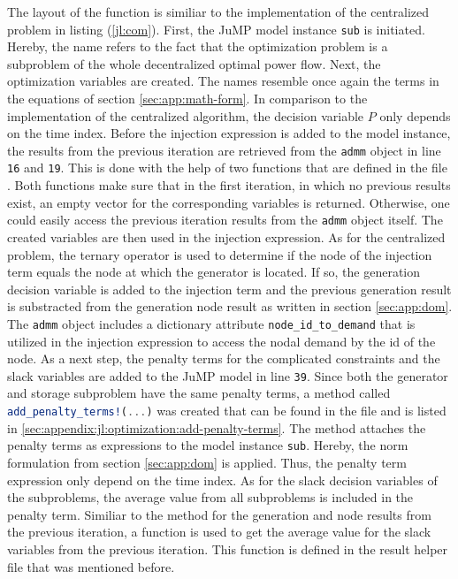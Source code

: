 The layout of the function is similiar to the implementation of the centralized problem in listing (\ref{jl:com}). First, the JuMP model instance \lstinline[language=julia]{sub} is initiated. Hereby, the name refers to the fact that the optimization problem is a subproblem of the whole decentralized optimal power flow. Next, the optimization variables are created. The names resemble once again the terms in the equations of section \ref{sec:app:math-form}. In comparison to the implementation of the centralized algorithm, the decision variable $P$ only depends on the time index. Before the injection expression is added to the model instance, the results from the previous iteration are retrieved from the \lstinline[language=julia]{admm} object in line \texttt{16} and \texttt{19}. This is done with the help of two functions that are defined in the file . Both functions make sure that in the first iteration, in which no previous results exist, an empty vector for the corresponding variables is returned. Otherwise, one could easily access the previous iteration results from the \lstinline[language=julia]{admm} object itself. The created variables are then used in the injection expression. As for the centralized problem, the ternary operator is used to determine if the node of the injection term equals the node at which the generator is located. If so, the generation decision variable is added to the injection term and the previous generation result is substracted from the generation node result as written in section \ref{sec:app:dom}. The \lstinline[language=julia]{admm} object includes a dictionary attribute \lstinline[language=julia]{node_id_to_demand} that is utilized in the injection expression to access the nodal demand by the id of the node. As a next step, the penalty terms for the complicated constraints and the slack variables are added to the JuMP model in line \texttt{39}. Since both the generator and storage subproblem have the same penalty terms, a method called \lstinline[language=julia]{add_penalty_terms!(...)} was created that can be found in the file  and is listed in \ref{sec:appendix:jl:optimization:add-penalty-terms}. The method attaches the penalty terms as expressions to the model instance \lstinline[language=julia]{sub}. Hereby, the norm formulation from section \ref{sec:app:dom} is applied. Thus, the penalty term expression only depend on the time index. As for the slack decision variables of the subproblems, the average value from all subproblems is included in the penalty term. Similiar to the method for the generation and node results from the previous iteration, a function is used to get the average value for the slack variables from the previous iteration. This function is defined in the result helper file that was mentioned before.





















